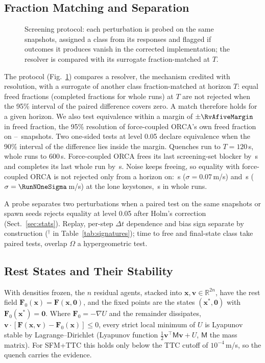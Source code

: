 \subsection{Fraction Matching and Separation}\label{sec:protocol}
\begin{figure}[t]\centering\caption{Screening protocol: each perturbation is probed on the same snapshots, assigned a class from its responses and flagged if outcomes it produces vanish in the corrected implementation; the resolver is compared with its surrogate fraction-matched at $T$.}\label{fig:protocol}\end{figure}
The protocol (Fig.~\ref{fig:protocol}) compares a resolver, the mechanism credited with resolution, with a surrogate of another class fraction-matched at horizon $T$: equal freed fractions (completed fractions for whole runs) at $T$ are not rejected when the 95\% interval of the paired difference covers zero. A match therefore holds for a given horizon. We also test equivalence within a margin of $\pm\RvAfiveMargin$ in freed fraction, the 95\% resolution of force-coupled ORCA's own freed fraction on \EtwoNLK--\PairN\ snapshots. Two one-sided tests at level 0.05 declare equivalence when the 90\% interval of the difference lies inside the margin.
Quenches run to $T=120$\,s, whole runs to 600\,s. Force-coupled ORCA frees its last screening-set blocker by \RevAeightSTRvoLatest\,s and completes its last whole run by \RevAeightWholeRvoLatest\,s. Noise keeps freeing, so equality with force-coupled ORCA is not rejected only from a horizon on: \RevAeightLKNoiseCMatchFrom\,s ($\sigma=0.07$\,m/s) and \RevAeightLKNoiseNoneMatchFrom\,s ($\sigma=\RunNOneSigma$\,m/s) at the lone keystones, \RevAeightWholeNoiseMatchFrom\,s in whole runs.

A probe separates two perturbations when a paired test on the same snapshots or spawn seeds rejects equality at level 0.05 after Holm's correction (Sect.~\ref{sec:stats}). Replay, per-step $\Delta t$ dependence and bias sign separate by construction (${}^\dagger$ in Table~\ref{tab:signatures}); time to free and final-state class take paired tests, overlap $\Omega$ a hypergeometric test.

\subsection{Rest States and Their Stability}\label{sec:rest}
With densities frozen, the $n$ residual agents, stacked into $\mathbf{x},\mathbf{v}\in\mathbb R^{2n}$, have the rest field $\mathbf{F}_0(\mathbf{x})=\mathbf{F}(\mathbf{x},\mathbf{0})$, and the fixed points are the states $(\mathbf{x}^\ast,\mathbf{0})$ with $\mathbf{F}_0(\mathbf{x}^\ast)=\mathbf{0}$. Where $\mathbf{F}_0=-\nabla U$ and the remainder dissipates, $\mathbf{v}\cdot[\mathbf{F}(\mathbf{x},\mathbf{v})-\mathbf{F}_0(\mathbf{x})]\le0$, every strict local minimum of $U$ is Lyapunov stable by Lagrange--Dirichlet (Lyapunov function $\tfrac12\mathbf{v}^{\top}\mathsf{M}\mathbf{v}+U$, $\mathsf{M}$ the mass matrix). For SFM+TTC this holds only below the TTC cutoff of $10^{-4}$\,m/s, so the quench carries the evidence.


